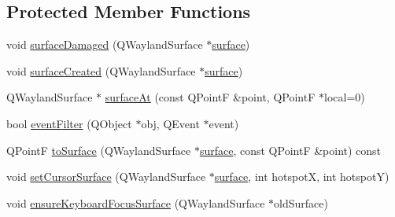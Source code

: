 \subsection*{Protected Member Functions}
\begin{DoxyCompactItemize}
\item 
void \hyperlink{classqtmotorcar_1_1QtWaylandMotorcarCompositor_a12ce718691bc19318acd23b981a72cb8}{surface\-Damaged} (Q\-Wayland\-Surface $\ast$\hyperlink{simple-egl_8c_a0720952aa1caded45b5bcdce589663a9}{surface})
\item 
void \hyperlink{classqtmotorcar_1_1QtWaylandMotorcarCompositor_a4bda9a0989cb8c22e7b5d1a687763b61}{surface\-Created} (Q\-Wayland\-Surface $\ast$\hyperlink{simple-egl_8c_a0720952aa1caded45b5bcdce589663a9}{surface})
\item 
Q\-Wayland\-Surface $\ast$ \hyperlink{classqtmotorcar_1_1QtWaylandMotorcarCompositor_adcc9307301b665c9d5ccea73fef01453}{surface\-At} (const Q\-Point\-F \&point, Q\-Point\-F $\ast$local=0)
\item 
bool \hyperlink{classqtmotorcar_1_1QtWaylandMotorcarCompositor_a1d5c76d5c4dfd029d90803d889c07206}{event\-Filter} (Q\-Object $\ast$obj, Q\-Event $\ast$event)
\item 
Q\-Point\-F \hyperlink{classqtmotorcar_1_1QtWaylandMotorcarCompositor_af3c3c2e2dbfd18427c8b38f83f0fa01f}{to\-Surface} (Q\-Wayland\-Surface $\ast$\hyperlink{simple-egl_8c_a0720952aa1caded45b5bcdce589663a9}{surface}, const Q\-Point\-F \&point) const 
\item 
void \hyperlink{classqtmotorcar_1_1QtWaylandMotorcarCompositor_a4555fa6ed0c867668fe735d9192331c7}{set\-Cursor\-Surface} (Q\-Wayland\-Surface $\ast$\hyperlink{simple-egl_8c_a0720952aa1caded45b5bcdce589663a9}{surface}, int hotspot\-X, int hotspot\-Y)
\item 
void \hyperlink{classqtmotorcar_1_1QtWaylandMotorcarCompositor_ac2210c9eaefdc154eac4111807232eb0}{ensure\-Keyboard\-Focus\-Surface} (Q\-Wayland\-Surface $\ast$old\-Surface)
\end{DoxyCompactItemize}



